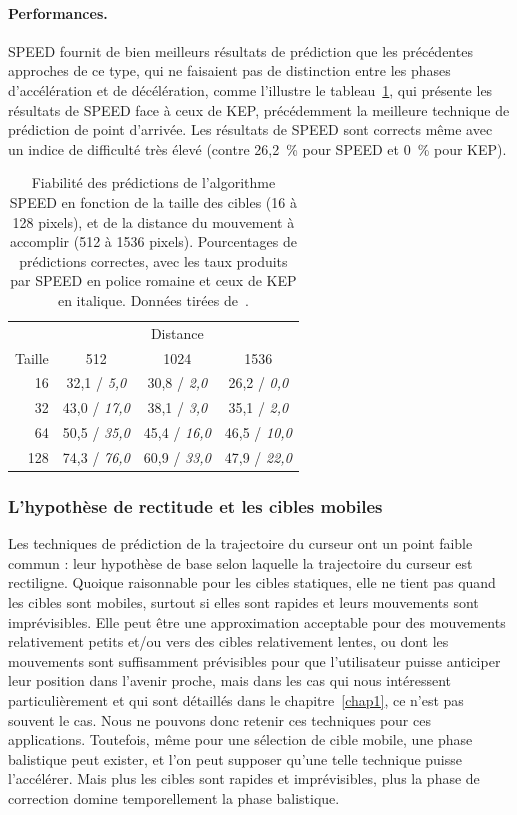 	\paragraph{Performances.}
	SPEED fournit de bien meilleurs résultats de prédiction que les précédentes approches de ce type, qui ne faisaient pas de distinction entre les phases d'accélération et de décélération, comme l'illustre le tableau~\ref{tab:speedingPastKep}, qui présente les résultats de SPEED face à ceux de KEP, précédemment la meilleure technique de prédiction de point d'arrivée. Les résultats de SPEED sont corrects même avec un indice de difficulté très élevé (contre 26,2~\%{} pour SPEED et 0~\%{} pour KEP).

	
	\begin{table}
	\centering
	\begin{tabular}{r | c c c}
				& \multicolumn{3}{c}{Distance}	\\
		Taille	& 512					& 1024					& 1536					\\ \hline
		16		& 32,1 / \emph{5,0}		& 30,8 / \emph{2,0}		& 26,2 / \emph{0,0}		\bigstrut[t] \\
		32		& 43,0 / \emph{17,0}	& 38,1 / \emph{3,0}		& 35,1 / \emph{2,0}		\\
		64		& 50,5 / \emph{35,0}	& 45,4 / \emph{16,0}	& 46,5 / \emph{10,0}	\\
		128		& 74,3 / \emph{76,0}	& 60,9 / \emph{33,0}	& 47,9 / \emph{22,0}	\\
	\end{tabular}
	\caption[SPEED -- performances comparées à celles de KEP]{Fiabilité des prédictions de l'algorithme SPEED en fonction de la taille des cibles (16 à 128 pixels), et de la distance du mouvement à accomplir (512 à 1536 pixels). Pourcentages de prédictions correctes, avec les taux produits par SPEED en police romaine et ceux de KEP en italique. Données tirées de~\cite{wonner2011speed}.}
	\label{tab:speedingPastKep}
	\end{table}
		
	\subsubsection{L'hypothèse de rectitude et les cibles mobiles}
	Les techniques de prédiction de la trajectoire du curseur ont un point faible commun : leur hypothèse de base selon laquelle la trajectoire du curseur est rectiligne. Quoique raisonnable pour les cibles statiques, elle ne tient pas quand les cibles sont mobiles, surtout si elles sont rapides et leurs mouvements sont imprévisibles. Elle peut être une approximation acceptable pour des mouvements relativement petits et/ou vers des cibles relativement lentes, ou dont les mouvements sont suffisamment prévisibles pour que l'utilisateur puisse anticiper leur position dans l'avenir proche, mais dans les cas qui nous intéressent particulièrement et qui sont détaillés dans le chapitre~\ref{chap1}, ce n'est pas souvent le cas. Nous ne pouvons donc retenir ces techniques pour ces applications. Toutefois, même pour une sélection de cible mobile, une phase balistique peut exister, et l'on peut supposer qu'une telle technique puisse l'accélérer. Mais plus les cibles sont rapides et imprévisibles, plus la phase de correction domine temporellement la phase balistique.

